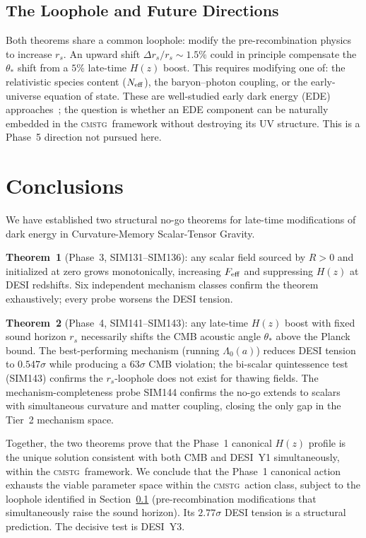 \documentclass[12pt,a4paper]{article}
\newcommand{\CMSTG}{\textsc{cmstg}}
\newcommand{\Feff}{F_{\rm eff}}
\newcommand{\Lz}{\Lambda_0}
\newcommand{\thetastar}{\theta_*}
\newcommand{\rs}{r_s}
\theoremstyle{plain}
\begin{document}
\subsection{The Loophole and Future Directions}
\label{sec:loophole}

Both theorems share a common loophole: modify the pre-recombination physics to
increase $\rs$. An upward shift $\Delta\rs/\rs\sim1.5\%$ could in principle
compensate the $\thetastar$ shift from a $5\%$ late-time $H(z)$ boost. This
requires modifying one of: the relativistic species content ($N_{\rm eff}$),
the baryon--photon coupling, or the early-universe equation of state. These
are well-studied early dark energy (EDE) approaches~\cite{Poulin2019}; the question is whether
an EDE component can be naturally embedded in the \CMSTG\ framework without
destroying its UV structure. This is a Phase~5 direction not pursued here.

\section{Conclusions}
\label{sec:conclusions}

We have established two structural no-go theorems for late-time modifications
of dark energy in Curvature-Memory Scalar-Tensor Gravity.

\textbf{Theorem~1} (Phase~3, SIM131--SIM136): any scalar field sourced by
$R>0$ and initialized at zero grows monotonically, increasing $\Feff$ and
suppressing $H(z)$ at DESI redshifts. Six independent mechanism classes confirm
the theorem exhaustively; every probe worsens the DESI tension.

\textbf{Theorem~2} (Phase~4, SIM141--SIM143): any late-time $H(z)$ boost with
fixed sound horizon $\rs$ necessarily shifts the CMB acoustic angle $\thetastar$
above the Planck bound. The best-performing mechanism (running $\Lz(a)$) reduces
DESI tension to $0.547\sigma$ while producing a $63\sigma$ CMB violation; the
bi-scalar quintessence test (SIM143) confirms the $\rs$-loophole does not exist
for thawing fields. The mechanism-completeness probe SIM144 confirms the no-go
extends to scalars with simultaneous curvature and matter coupling, closing the
only gap in the Tier~2 mechanism space.

Together, the two theorems prove that the Phase~1 canonical $H(z)$ profile is
the unique solution consistent with both CMB and DESI~Y1 simultaneously, within
the \CMSTG\ framework. We conclude that the Phase~1 canonical action exhausts
the viable parameter space within the \CMSTG\ action class, subject to the
loophole identified in Section~\ref{sec:loophole} (pre-recombination
modifications that simultaneously raise the sound horizon). Its $2.77\sigma$
DESI tension is a structural prediction. The decisive test is DESI~Y3.
\end{document}
